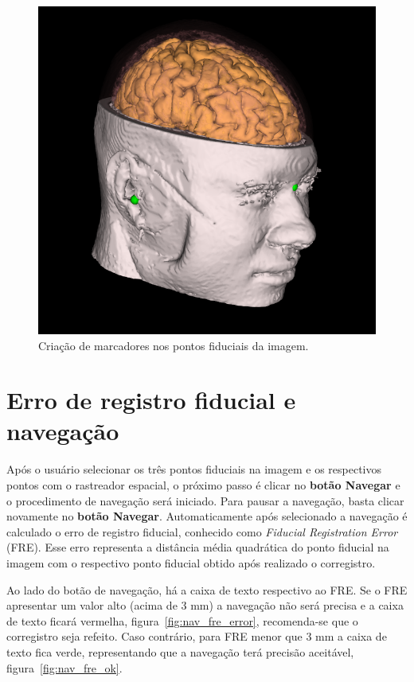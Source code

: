 \begin{figure}[!htb]
\centering
\includegraphics[scale=0.5]{../user_guide_figures/invesalius_screen/nav_balls_in_head.png}
\caption{Criação de marcadores nos pontos fiduciais da imagem.}
\label{fig:nav_balls_in_head}
\end{figure}


\section{Erro de registro fiducial e navegação}

Após o usuário selecionar os três pontos fiduciais na imagem e os respectivos pontos com o rastreador espacial, o próximo passo é clicar no \textbf{botão Navegar} e o procedimento de navegação será iniciado. Para pausar a navegação, basta clicar novamente no \textbf{botão Navegar}. Automaticamente após selecionado a navegação é calculado o erro de registro fiducial, conhecido como \textit{Fiducial Registration Error} (FRE). Esse erro representa a distância média quadrática do ponto fiducial na imagem com o respectivo ponto fiducial obtido após realizado o corregistro. 

Ao lado do botão de navegação, há a caixa de texto respectivo ao FRE. Se o FRE apresentar um valor alto (acima de 3 mm) a navegação não será precisa e a caixa de texto ficará vermelha, figura~\ref{fig:nav_fre_error}, recomenda-se que o corregistro seja refeito. Caso contrário, para FRE menor que 3 mm a caixa de texto fica verde, representando que a navegação terá precisão aceitável, figura~\ref{fig:nav_fre_ok}.

